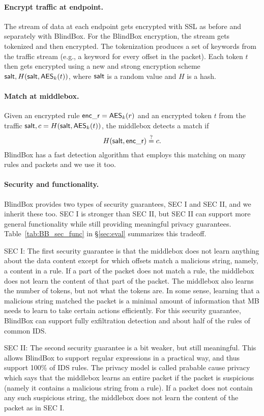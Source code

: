 \paragraph{Encrypt traffic at endpoint.}
The stream of data at each endpoint gets encrypted with SSL as before 
and separately with BlindBox. 
For the BlindBox encryption, the stream gets tokenized and then encrypted. 
The tokenization produces a set of keywords from the traffic stream (e.g.,
a keyword for every offset in the packet). Each token $t$ then gets encrypted using
a new and strong encryption scheme $\mathsf{salt}, H(\mathsf{salt}, \mathsf{AES}_k(t))$, where 
$\mathsf{salt}$ is a random value and $H$ is a hash. 

\paragraph{Match at middlebox.} 
Given an encrypted rule $\mathsf{enc\_r} = \mathsf{AES}_k(r)$ and an encrypted token $t$ from the traffic
$\mathsf{salt}, c = H(\mathsf{salt}, \mathsf{AES}_k(t))$, the middlebox detects a match if 
\[H(\mathsf{salt}, \mathsf{enc\_r}) \stackrel{?}{=} c.\] 
BlindBox has a fast detection algorithm that employs this matching on many rules and
packets and we use it too.


\paragraph{Security and functionality.}
BlindBox provides two types of security guarantees, SEC I and SEC II,  and we inherit these too. 
SEC I is stronger than SEC II, but SEC II can support more general functionality while 
still providing meaningful privacy guarantees.
Table~\ref{tab:BB_sec_func} in \S\ref{sec:eval} summarizes this tradeoff. 

SEC I: The first security guarantee is that the middlebox does not learn anything about the data
content except for which offsets match a malicious string, namely, a content in a rule. 
If a part of the packet does not match a rule, the middlebox does not learn the content 
of that part of the packet. The middlebox also learns the number of tokens, but not what
the tokens are. In some sense, learning that a malicious string matched the packet is 
a minimal amount of information that MB needs to learn to take certain actions efficiently.
 For this security guarantee, BlindBox can support fully exfiltration 
detection and about half of the rules of common IDS. 

SEC II: The second security guarantee is a bit weaker, but still meaningful. This allows BlindBox
to support regular expressions in a practical way, and thus support 100\% of IDS rules. 
The privacy model is called prabable cause privacy which says that the middlebox
learns an entire packet if the packet is suspicious (namely it contains a  malicious string from a rule). 
If a packet does not contain any such suspicious string, the middlebox does not learn the content of the packet as 
in SEC I. 



